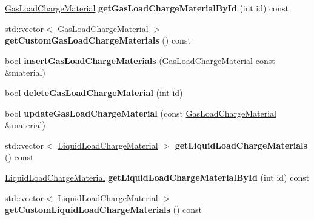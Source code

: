 \begin{DoxyCompactItemize}
\item 
\mbox{\label{class_s_q_lite_ab89ac4049cbedcb6340f5d7d0139b89e}} 
\hyperlink{class_gas_load_charge_material}{Gas\+Load\+Charge\+Material} {\bfseries get\+Gas\+Load\+Charge\+Material\+By\+Id} (int id) const
\item 
\mbox{\label{class_s_q_lite_a1957d2f9ac35433b45e8511aa6889756}} 
std\+::vector$<$ \hyperlink{class_gas_load_charge_material}{Gas\+Load\+Charge\+Material} $>$ {\bfseries get\+Custom\+Gas\+Load\+Charge\+Materials} () const
\item 
\mbox{\label{class_s_q_lite_af482f51c0d3de08fbfa3e537382a567f}} 
bool {\bfseries insert\+Gas\+Load\+Charge\+Materials} (\hyperlink{class_gas_load_charge_material}{Gas\+Load\+Charge\+Material} const \&material)
\item 
\mbox{\label{class_s_q_lite_a3717a443c1151d717168d323ec6576c1}} 
bool {\bfseries delete\+Gas\+Load\+Charge\+Material} (int id)
\item 
\mbox{\label{class_s_q_lite_a21b8fbcd52ac37fe9e78df164ee8de25}} 
bool {\bfseries update\+Gas\+Load\+Charge\+Material} (const \hyperlink{class_gas_load_charge_material}{Gas\+Load\+Charge\+Material} \&material)
\item 
\mbox{\label{class_s_q_lite_a349f65213cc1b022293bc00ba0a4c3b5}} 
std\+::vector$<$ \hyperlink{class_liquid_load_charge_material}{Liquid\+Load\+Charge\+Material} $>$ {\bfseries get\+Liquid\+Load\+Charge\+Materials} () const
\item 
\mbox{\label{class_s_q_lite_a3f31756b0fc49be7123e7146cbb12c70}} 
\hyperlink{class_liquid_load_charge_material}{Liquid\+Load\+Charge\+Material} {\bfseries get\+Liquid\+Load\+Charge\+Material\+By\+Id} (int id) const
\item 
\mbox{\label{class_s_q_lite_a1a252d50bc2e861325f120a814fddd37}} 
std\+::vector$<$ \hyperlink{class_liquid_load_charge_material}{Liquid\+Load\+Charge\+Material} $>$ {\bfseries get\+Custom\+Liquid\+Load\+Charge\+Materials} () const
\item 
\mbox{\label{class_s_q_lite_aff9ccdb8af003d3a0a3fdc9a85af77d8}} 

\end{DoxyCompactItemize}
